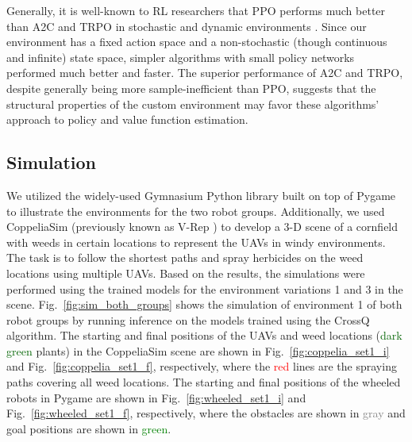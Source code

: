 \documentclass[letterpaper, 10 pt, conference]{ieeeconf}  %
\begin{document}
Generally, it is well-known to RL researchers that PPO performs much better than A2C and TRPO in stochastic and dynamic environments \cite{schulman2017ppo, henderson2018deep}. Since our environment has a fixed action space and a non-stochastic (though continuous and infinite) state space, simpler algorithms with small policy networks performed much better and faster. The superior performance of A2C and TRPO, despite generally being more sample-inefficient than PPO, suggests that the structural properties of the custom environment may favor these algorithms' approach to policy and value function estimation. %


\subsection{Simulation}
We utilized the widely-used Gymnasium \cite{towers2024gymnasium} Python library built on top of Pygame \cite{pygame} to illustrate the environments for the two robot groups. Additionally, we used CoppeliaSim \cite{coppeliaSim2013} (previously known as V-Rep \cite{vrep2013}) to develop a 3-D scene of a cornfield with weeds in certain locations to represent the UAVs in windy environments. The task is to follow the shortest paths and spray herbicides on the weed locations using multiple UAVs. Based on the results, the simulations were performed using the trained models for the environment variations 1 and 3 in the scene. Fig.~\ref{fig:sim_both_groups} shows the simulation of environment 1 of both robot groups by running inference on the models trained using the CrossQ \cite{bhatt2024crossq} algorithm. The starting and final positions of the UAVs and weed locations (\textcolor{darkgreen}{dark green} plants) in the CoppeliaSim scene are shown in Fig.~\ref{fig:coppelia_set1_i} and  Fig.~\ref{fig:coppelia_set1_f}, respectively, where the \textcolor{red}{red} lines are the spraying paths covering all weed locations. The starting and final positions of the wheeled robots in Pygame are shown in Fig.~\ref{fig:wheeled_set1_i} and  Fig.~\ref{fig:wheeled_set1_f}, respectively, where the obstacles are shown in \textcolor{gray}{gray} and goal positions are shown in \textcolor{green}{green}.
\end{document}
